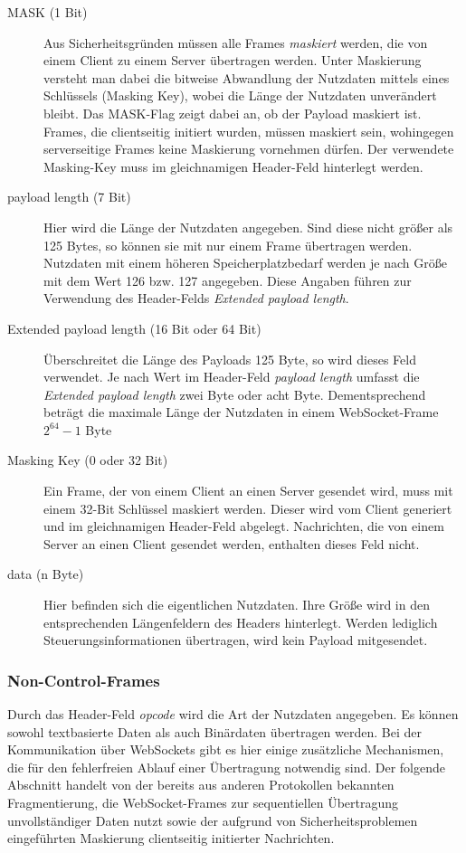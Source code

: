 \documentclass[11pt,a4paper,titlepage]{scrartcl}
\numberwithin{equation}{section}
\begin{document}
\begin{description}
\begin{itemize}
	\end{itemize}
	\item[MASK (1 Bit)] Aus Sicherheitsgründen müssen alle Frames \textit{maskiert} werden, die von einem Client zu einem Server übertragen werden. Unter Maskierung versteht man dabei die bitweise Abwandlung der Nutzdaten mittels eines Schlüssels (Masking Key), wobei die Länge der Nutzdaten unverändert bleibt. Das MASK-Flag zeigt dabei an, ob der  Payload maskiert ist. Frames, die clientseitig initiert wurden, müssen maskiert sein, wohingegen serverseitige Frames keine Maskierung vornehmen dürfen. Der verwendete Masking-Key muss im gleichnamigen Header-Feld hinterlegt werden.
	\item[payload length (7 Bit)] Hier wird die Länge der Nutzdaten angegeben. Sind diese nicht größer als 125 Bytes, so können sie mit nur einem Frame übertragen werden. Nutzdaten mit einem höheren Speicherplatzbedarf werden je nach Größe mit dem Wert 126 bzw. 127 angegeben. Diese Angaben führen zur Verwendung des Header-Felds \textit{Extended payload length}.
	\item[Extended payload length (16 Bit oder 64 Bit)] Überschreitet die Länge des Payloads 125 Byte, so wird dieses Feld verwendet. Je nach Wert im Header-Feld \textit{payload length} umfasst die \textit{Extended payload length} zwei Byte oder acht Byte. Dementsprechend beträgt die maximale Länge der Nutzdaten in einem WebSocket-Frame $2^{64} - 1$ Byte \autocite[41]{gorski_websockets_2015}
	\item[Masking Key (0 oder 32 Bit)] Ein Frame, der von einem Client an einen Server gesendet wird, muss mit einem 32-Bit Schlüssel maskiert werden. Dieser wird vom Client generiert und im gleichnamigen Header-Feld abgelegt. Nachrichten, die von einem Server an einen Client gesendet werden, enthalten dieses Feld nicht.
	\item[data (n Byte)] Hier befinden sich die eigentlichen Nutzdaten. Ihre Größe wird in den entsprechenden Längenfeldern des Headers hinterlegt. Werden lediglich Steuerungsinformationen übertragen, wird kein Payload mitgesendet.
\end{description}

\subsubsection{Non-Control-Frames}\label{subsubsec:wsNCFrames} 
Durch das Header-Feld \textit{opcode} wird die Art der Nutzdaten angegeben. Es können sowohl textbasierte Daten als auch Binärdaten übertragen werden. Bei der Kommunikation über WebSockets gibt es hier einige zusätzliche Mechanismen, die für den fehlerfreien Ablauf einer Übertragung notwendig sind. Der folgende Abschnitt handelt von der bereits aus anderen Protokollen bekannten Fragmentierung, die WebSocket-Frames zur sequentiellen Übertragung unvollständiger Daten nutzt sowie der aufgrund von Sicherheitsproblemen eingeführten Maskierung clientseitig initierter Nachrichten.
\end{document}
